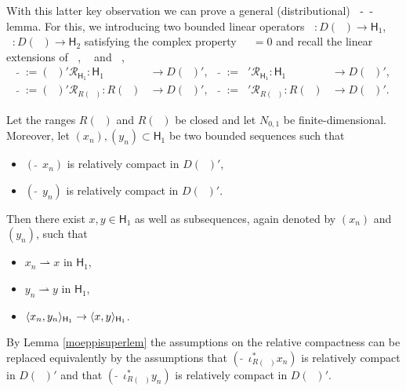 \documentclass[a4paper]{amsart}
\newcommand{\wto}{\rightharpoonup}
\renewcommand{\H}{\mathsf{H}}
\renewcommand{\R}{\mathcal{R}}
\DeclareMathOperator{\Az}{A_{0}}
\DeclareMathOperator{\Azs}{A_{0}^{*}}
\DeclareMathOperator{\cAz}{\mathcal{A}_{0}}
\DeclareMathOperator{\cAzs}{\mathcal{A}_{0}^{*}}
\DeclareMathOperator{\Ao}{A_{1}}
\DeclareMathOperator{\Aos}{A_{1}^{*}}
\DeclareMathOperator{\cAo}{\mathcal{A}_{1}}
\DeclareMathOperator{\cAos}{\mathcal{A}_{1}^{*}}
\begin{document}
With this latter key observation 
we can prove a general (distributional) $\Azs$-$\Ao$-lemma. 
For this, we introducing two bounded linear operators 
$\Az:D(\Az)\to\H_{1}$, $\Ao:D(\Ao)\to\H_{2}$
satisfying the complex property $\Ao\Az=0$
and recall the linear extensions of $\Ao$, $\cAo$ and $\Azs$, $\cAzs$
\begin{align*}
\widetilde{\Ao}:=(\Aos)'\R_{\H_{1}}:\H_{1}&\to D(\Aos)',
&
\widetilde{\Azs}:=\Az'\R_{\H_{1}}:\H_{1}&\to D(\Az)',\\
\widetilde{\cAo}:=(\cAos)'\R_{R(\Aos)}:R(\Aos)&\to D(\cAos)',
&
\widetilde{\cAzs}:=\cAz'\R_{R(\Az)}:R(\Az)&\to D(\cAz)'.
\end{align*}

\begin{theo}[generalized $\Azs$-$\Ao$-lemma, {\cite[Theorem 2.4]{waurick2018a}}]
Let the ranges $R(\Az)$ and $R(\Ao)$ be closed and let $N_{0,1}$ be finite-dimensional.
Moreover, let $(x_{n}),(y_{n})\subset\H_{1}$ be two
bounded sequences such that
\begin{itemize}
\item
$(\widetilde{\Ao}\,x_{n})$ is relatively compact in $D(\Aos)'$,
\item
$(\widetilde{\Azs}\,y_{n})$ is relatively compact in $D(\Az)'$.
\end{itemize}
Then there exist $x,y\in\H_{1}$ as well as subsequences, again denoted by $(x_{n})$ and $(y_{n})$, 
such that
\begin{itemize}
\item
$x_{n}\wto x$ in $\H_{1}$,
\item
$y_{n}\wto y$ in $\H_{1}$,
\item
$\scp{x_{n}}{y_{n}}_{\H_{1}}\to\scp{x}{y}_{\H_{1}}$.
\end{itemize}
\end{theo}

\begin{rem}
By Lemma \ref{moeppisuperlem} the assumptions 
on the relative compactness can be replaced equivalently by the assumptions that 
$(\widetilde{\cAo}\,\iota_{R(\Aos)}^{*}x_{n})$ is relatively compact in $D(\cAos)'$ and that
$(\widetilde{\cAzs}\,\iota_{R(\Az)}^{*}y_{n})$ is relatively compact in $D(\cAz)'$.
\end{rem}
\end{document}
